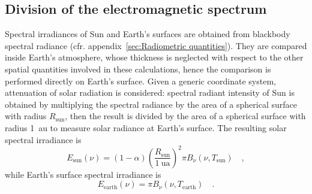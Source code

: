 \documentclass[a4paper,10pt,final,twocolumn]{article}
\begin{document}
\subsection{Division of the electromagnetic spectrum}
\label{sec:Division of the electromagnetic spectrum}
Spectral irradiances of Sun and Earth's surfaces are obtained from blackbody spectral radiance (cfr. appendix~\ref{sec:Radiometric quantities}). They are compared inside Earth's atmosphere, whose thickness is neglected with respect to the other spatial quantities involved in these calculations, hence the comparison is performed directly on Earth's surface. Given a generic coordinate system, attenuation of solar radiation is considered: spectral radiant intensity of Sun is obtained by multiplying the spectral radiance by the area of a spherical surface with radius $R_\text{sun}$, then the result is divided by the area of a spherical surface with radius \qty{1}{\astronomicalunit} to measure solar radiance at Earth's surface. The resulting solar spectral irradiance is
\begin{equation}
  \label{eq:spectral_irradiance_sun}
  E_\text{sun}(\nu) = (1 - \alpha) \left( \frac{R_\text{sun}}{\qty{1}{\astronomicalunit}} \right)^2 \pi B_\nu(\nu, T_\text{sun})
  \quad ,
\end{equation}
while Earth's surface spectral irradiance is
\begin{equation}
  \label{eq:spectral_irradiance_earth}
  E_\text{earth}(\nu) = \pi B_\nu(\nu, T_\text{earth})
  \quad .
\end{equation}
\end{document}
